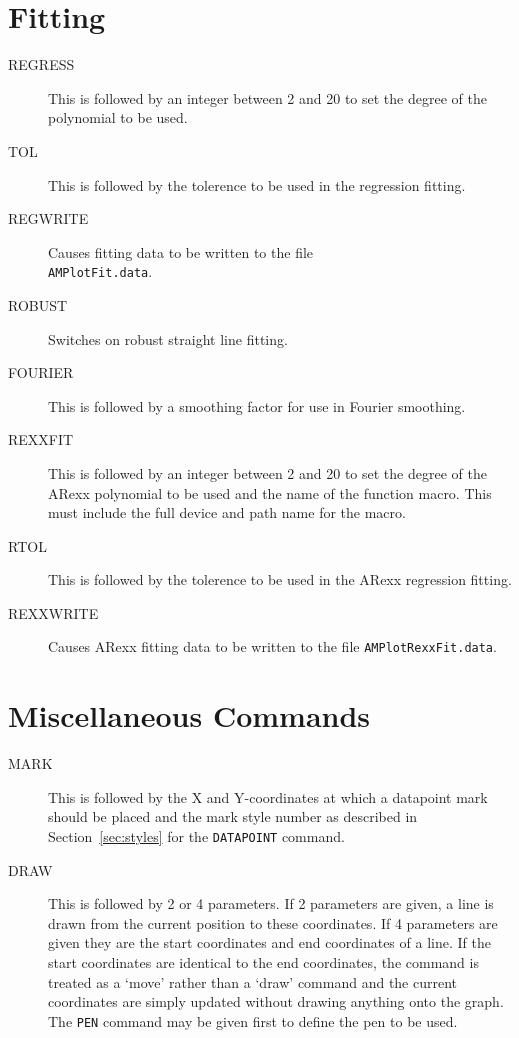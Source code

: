 \documentclass{report}
\begin{document}
\section{Fitting}
\begin{description}
\item[REGRESS] This is followed by an integer between 2 and 20 to set the degree 
of the polynomial to be used.
\item[TOL] This is followed by the tolerence to be used in the regression fitting.
\item[REGWRITE] Causes fitting data to be written to the file\\
{\tt AMPlotFit.data}.
\item[ROBUST] Switches on robust straight line fitting.
\item[FOURIER] This is followed by a smoothing factor for use in Fourier 
smoothing.
\item[REXXFIT] This is followed by an integer between 2 and 20 to set the degree 
of the ARexx polynomial to be used and the name of the function macro. This must 
include the full device and path name for the macro.
\item[RTOL] This is followed by the tolerence to be used in the ARexx regression 
fitting.
\item[REXXWRITE] Causes ARexx fitting data to be written to the file 
{\tt AMPlotRexxFit.data}.
\end{description}

\section{Miscellaneous Commands}
\begin{description}
\item[MARK\dag] This is followed by the X and Y-coordinates at which a datapoint mark 
should be placed and the mark style number as described in Section~\ref{sec:styles} 
for the {\tt DATAPOINT} command.
\item[DRAW\dag] This is followed by 2 or 4 parameters. If 2 parameters are given,
a line is 
drawn from the current position to these coordinates. If 4 parameters are given they 
are the start coordinates and end coordinates of a line. If the start coordinates 
are identical to the end coordinates, the command is treated as a `move' rather than 
a `draw' command and the current coordinates are simply updated without drawing 
anything onto the graph. The {\tt PEN} command may be given first to define the pen 
to be used.


\end{description}
\end{document}
